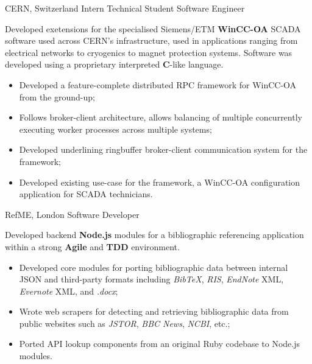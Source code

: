 \documentclass[12pt,a4paper]{article}
\begin{document}
       {CERN, Switzerland}
       {Intern Technical Student Software Engineer}
{%
  Developed exetensions for the specialised Siemens/ETM {\bfseries WinCC-OA}
  SCADA software used across CERN's infrastructure, used in applications ranging
  from electrical networks to cryogenics to magnet protection systems. Software
  was developed using a proprietary interpreted {\bfseries C}-like language.

  \begin{itemize}

    \item Developed a feature-complete distributed RPC framework for WinCC-OA
      from the ground-up;

    \item Follows broker-client architecture, allows balancing of multiple
      concurrently executing worker processes across multiple systems;

    \item Developed underlining ringbuffer broker-client communication system
      for the framework;

    \item Developed existing use-case for the framework, a WinCC-OA
      configuration application for SCADA technicians.

  \end{itemize}
}

       {RefME, London}
       {Software Developer}
{%
  Developed backend {\bfseries Node.js} modules for a bibliographic referencing
  application within a strong {\bfseries Agile} and {\bfseries TDD} environment.

  \begin{itemize}

    \item Developed core modules for porting bibliographic data between
      internal JSON and third-party formats including
      \emph{BibTeX},
      \emph{RIS},
      \emph{EndNote} XML,
      \emph{Evernote} XML, and
      \emph{.docx};

    \item Wrote web scrapers for detecting and retrieving bibliographic data
      from public websites such as
      \emph{JSTOR},
      \emph{BBC News},
      \emph{NCBI}, etc.;

    \item Ported API lookup components from an original Ruby codebase to Node.js
      modules.

  \end{itemize}
}
\end{document}
